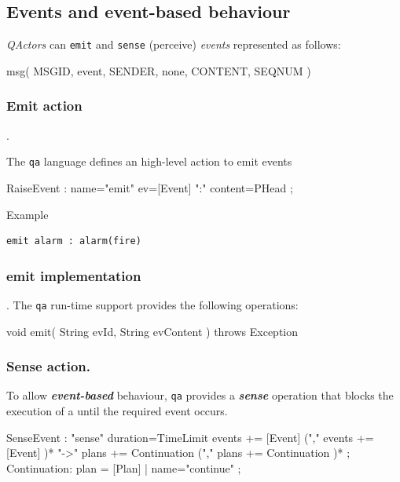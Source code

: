 \subsection{Events and event-based behaviour } 


\textit{QActors} can \texttt{emit} and \texttt{sense} (perceive) \textit{events	} represented as follows:

\begin{qacode}
msg( MSGID, event, SENDER, none, CONTENT, SEQNUM )
\end{qacode}

 
\subsubsection{Emit action}.

The \texttt{qa} language defines an high-level action to emit events
 
\begin{javacode}  
 RaiseEvent : name="emit" ev=[Event] ":" content=PHead  ;
\end{javacode}
	
\noindent Example 
\begin{Verbatim}[fontsize=\scriptsize, frame=single]
emit alarm : alarm(fire)
\end{Verbatim}

\subsubsection{emit implementation}.
The \texttt{qa} run-time support provides the following operations:
\begin{javacode}
void emit( String evId, String evContent ) throws Exception
\end{javacode}
 


 
\subsubsection{Sense action. }
To allow \textit{\textbf{event-based}} behaviour, \texttt{qa} provides a \textit{\textbf{sense}} operation that blocks the execution of a \qa{} until the required event occurs. 

 
 
\begin{javacode}  
SenseEvent : "sense" duration=TimeLimit events += [Event] ("," events += [Event] )*  
		"->" plans += Continuation ("," plans += Continuation )* ; 
Continuation: plan = [Plan] |  name="continue"  ;
\end{javacode}
 

